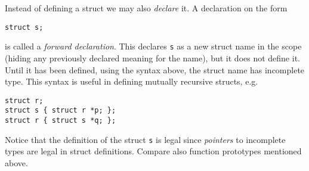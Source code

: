 \documentclass[article, a4paper, 11pt, oneside]{memoir}
\numberwithin{equation}{chapter}
\newcommand{\inlinecode}[1]{\colorbox{lightgray}{\vphantom{\texttt{jk}}\lstinline$#1$}}
\renewcommand{\inlinecode}{\lstinline}
\begin{document}
\begin{notelist}
Instead of defining a struct we may also \emph{declare} it. A declaration on the form
%
\begin{displayquote}
    \lstinline{struct s;}
\end{displayquote}
%
is called a \emph{forward declaration}. This declares \inlinecode{s} as a new struct name in the scope (hiding any previously declared meaning for the name), but it does not define it. Until it has been defined, using the syntax above, the struct name has incomplete type. This syntax is useful in defining mutually recursive structs, e.g.
%
\begin{displayquote}
    \lstinline|struct r;| \\
    \lstinline|struct s { struct r *p; };| \\
    \lstinline|struct r { struct s *q; };|
\end{displayquote}
%
Notice that the definition of the struct \inlinecode{s} is legal since \emph{pointers} to incomplete types are legal in struct definitions. Compare also function prototypes mentioned above.
\end{notelist}
\end{document}
